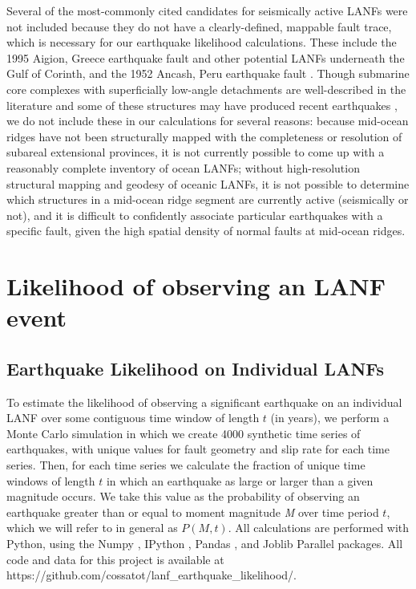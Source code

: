 \documentclass[draft,grl]{AGUTeX}
\begin{document}
\begin{article}
Several of the most-commonly cited candidates for seismically active LANFs were
not included because they do not have a clearly-defined, mappable fault trace,
which is necessary for our earthquake likelihood calculations.  These include
the 1995 Aigion, Greece earthquake fault \citep{bernard1997} and other
potential LANFs underneath the Gulf of Corinth, and the 1952 Ancash, Peru
earthquake fault \citep{doser1987ancash}. Though submarine core complexes with
superficially low-angle detachments are well-described in the literature and
some of these structures may have produced recent earthquakes
\citep{abers2001}, we do not include these in our calculations for several
reasons: because mid-ocean ridges have not been structurally mapped with the
completeness or resolution of subareal extensional provinces, it is not
currently possible to come up with a reasonably complete inventory of ocean
LANFs; without high-resolution structural mapping and geodesy of oceanic LANFs,
it is not possible to determine which structures in a mid-ocean ridge segment
are currently active (seismically or not), and it is difficult to confidently
associate particular earthquakes with a specific fault, given the high spatial
density of normal faults at mid-ocean ridges.


\section{Likelihood of observing an LANF event}
\subsection{Earthquake Likelihood on Individual LANFs}
To estimate the likelihood of observing a significant earthquake on an
individual LANF over some contiguous time window of length $t$ (in years), we
perform a Monte Carlo simulation in which we create 4000 synthetic time series
of earthquakes, with unique values for fault geometry and slip rate for each
time series. Then, for each time series we calculate the fraction of unique
time windows of length $t$ in which an earthquake as large or larger than
a given magnitude occurs.  We take this value as the probability of observing
an earthquake greater than or equal to moment magnitude \emph{M} over time
period $t$, which we will refer to in general as $P(M,t)$.  All calculations
are performed with Python, using the Numpy \citep{oliphant2007numpy}, IPython
\citep{perez2007ipython}, Pandas \citep{mckinney-proc-scipy-2010}, and Joblib
Parallel \citep{varoquaux_joblib} packages.  All code and data for this project
is available at https://github.com/cossatot/lanf\_earthquake\_likelihood/.


\end{article}
\end{document}
